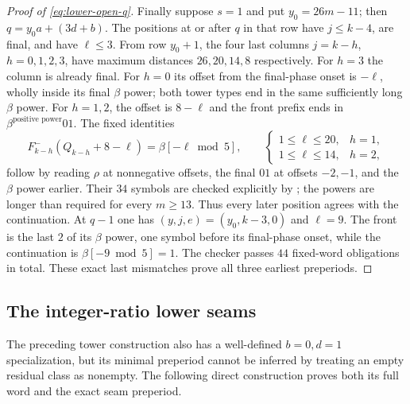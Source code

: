 \documentclass[11pt]{article}
\theoremstyle{remark}\newtheorem{remark}[theorem]{Remark}
\begin{document}
\begin{proof}[Proof of \eqref{eq:lower-open-q}]
Finally suppose $s=1$ and put $y_0=26m-11$; then
$q=y_0a+(3d+b)$. The positions at or after $q$ in that row have
$j\le k-4$, are final, and have $\ell\le3$.
From row $y_0+1$, the four last columns $j=k-h$, $h=0,1,2,3$, have
maximum distances $26,20,14,8$ respectively.
For $h=3$ the column is already final. For $h=0$ its offset from the
final-phase onset is $-\ell$, wholly inside its final $\beta$ power;
both tower types end in the same sufficiently long $\beta$ power.
For $h=1,2$, the offset is $8-\ell$ and the front prefix ends in
$\beta^{\text{positive power}}01$. The fixed identities
\[
 F^-_{k-h}(Q_{k-h}+8-\ell)=\beta[-\ell\bmod5],\qquad
 \begin{cases}1\le\ell\le20,&h=1,\\1\le\ell\le14,&h=2,
 \end{cases}
\]
follow by reading $\rho$ at nonnegative offsets, the final $01$ at
offsets $-2,-1$, and the $\beta$ power earlier. Their $34$ symbols are
checked explicitly by ; the powers
are longer than required for every $m\ge13$.
Thus every later position agrees with the continuation.
At $q-1$ one has $(y,j,e)=(y_0,k-3,0)$ and $\ell=9$.
The front is the last $2$ of its $\beta$ power, one symbol before
its final-phase onset, while the continuation is
$\beta[-9\bmod5]=1$.
The checker passes $44$ fixed-word obligations in total.
These exact last mismatches prove all three earliest preperiods.
\end{proof}

\subsection{The integer-ratio lower seams}
The preceding tower construction also has a well-defined $b=0,d=1$
specialization, but its minimal preperiod cannot be inferred by treating
an empty residual class as nonempty. The following direct construction
proves both its full word and the exact seam preperiod.
\end{document}
